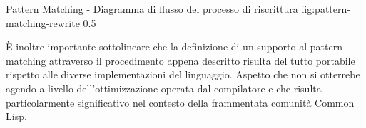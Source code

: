       {Pattern Matching - Diagramma di flusso del processo di riscrittura}
      {fig:pattern-matching-rewrite}
      {0.5}

È inoltre importante sottolineare che la definizione di un supporto al pattern
matching attraverso il procedimento appena descritto risulta del tutto portabile
rispetto alle diverse implementazioni del linguaggio. Aspetto che non si
otterrebe agendo a livello dell'ottimizzazione operata dal compilatore e che
risulta particolarmente significativo nel contesto della frammentata comunità
Common Lisp.
